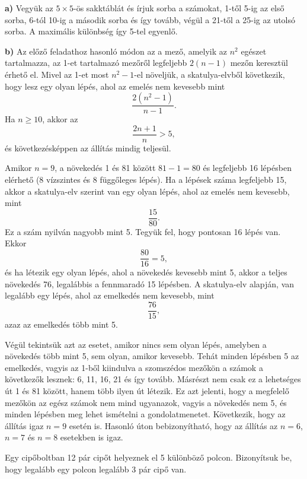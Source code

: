 \begin{solution}
	\textbf{a)} Vegyük az $5\times5$-ös sakktáblát és írjuk sorba a számokat,
	1-től 5-ig az első sorba, 6-tól 10-ig a második sorba és így tovább,
	végül a 21-től a 25-ig az utolsó sorba. A maximális különbség így
	5-tel egyenlő.
	
	\textbf{b)} Az előző feladathoz hasonló módon az a mező, amelyik az
	$n^{2}$ egészet tartalmazza, az 1-et tartalmazó mezőről legfeljebb
	$2(n-1)$ mezőn keresztül érhető el. Mivel az 1-et most $n^{2}-1$-el
	növeljük, a skatulya-elvből következik, hogy lesz egy olyan lépés,
	ahol az emelés nem kevesebb mint 
	\[
	\frac{2(n^{2}-1)}{n-1}.
	\]
	Ha $n\geq10$, akkor az 
	\[
	\frac{2n+1}{n}>5,
	\]
	és következésképpen az állítás mindig teljesül.
	
	Amikor $n=9$, a növekedés 1 és 81 között $81-1=80$ és legfeljebb
	16 lépésben elérhető (8 vízszintes és 8 függőleges lépés). Ha a lépések
	száma legfeljebb 15, akkor a skatulya-elv szerint van egy olyan lépés,
	ahol az emelés nem kevesebb, mint 
	\[
	\frac{15}{80}.
	\]
	Ez a szám nyilván nagyobb mint 5. Tegyük fel, hogy pontosan 16 lépés
	van. Ekkor 
	\[
	\frac{80}{16}=5,
	\]
	és ha létezik egy olyan lépés, ahol a növekedés kevesebb mint 5, akkor
	a teljes növekedés 76, legalábbis a fennmaradó 15 lépésben. A skatulya-elv
	alapján, van legalább egy lépés, ahol az emelkedés nem kevesebb, mint
	\[
	\frac{76}{15},
	\]
	azaz az emelkedés több mint 5.
	
	Végül tekintsük azt az esetet, amikor nincs sem olyan lépés, amelyben
	a növekedés több mint 5, sem olyan, amikor kevesebb. Tehát minden
	lépésben 5 az emelkedés, vagyis az 1-ből kiindulva a szomszédos mezőkön
	a számok a következők lesznek: 6, 11, 16, 21 és így tovább. Másrészt
	nem csak ez a lehetséges út 1 és 81 között, hanem több ilyen út létezik.
	Ez azt jelenti, hogy a megfelelő mezőkön az egész számok nem mind
	ugyanazok, vagyis a növekedés nem 5, és minden lépésben meg lehet
	ismételni a gondolatmenetet. Következik, hogy az állítás igaz $n=9$
	esetén is. Hasonló úton bebizonyítható, hogy az állítás az $n=6$,
	$n=7$ és $n=8$ esetekben is igaz.
\end{solution}
\begin{extraproblem}
	Egy cipőboltban 12 pár cipőt helyeznek el 5 különböző polcon. Bizonyítsuk
	be, hogy legalább egy polcon legalább 3 pár cipő van. 
\end{extraproblem}

